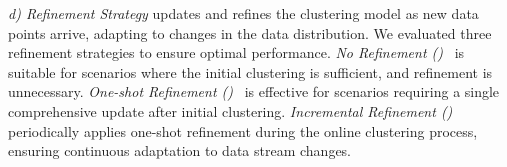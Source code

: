 \textit{d) Refinement Strategy} updates and refines the clustering model as new data points arrive, adapting to changes in the data distribution. We evaluated three refinement strategies to ensure optimal performance. \emph{No Refinement (\norefinement)}~\cite{BIRCH:96, DStream:2007, EDMStream:17, SL-KMeans:20} is suitable for scenarios where the initial clustering is sufficient, and refinement is unnecessary. \emph{One-shot Refinement (\oneshotRefinement)}~\cite{Clustream:03, DenStream:06, StreamKM++:12, DBStream:16} is effective for scenarios requiring a single comprehensive update after initial clustering. \emph{Incremental Refinement (\incrementalRefinement)} periodically applies one-shot refinement during the online clustering process, ensuring continuous adaptation to data stream changes.




